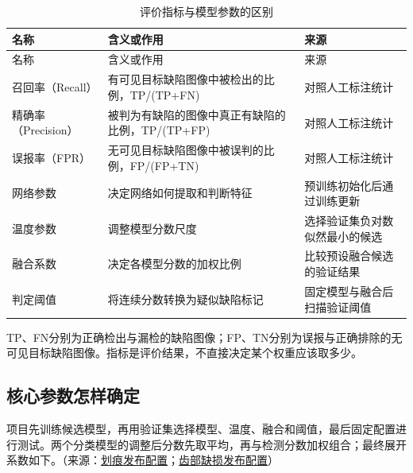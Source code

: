 \begingroup\small{}
\begin{longtable}{@{}>{\raggedright\arraybackslash}p{0.240\dimexpr\linewidth-4\tabcolsep\relax}>{\raggedright\arraybackslash}p{0.340\dimexpr\linewidth-4\tabcolsep\relax}>{\raggedright\arraybackslash}p{0.420\dimexpr\linewidth-4\tabcolsep\relax}@{}}
\caption{评价指标与模型参数的区别}\\
\toprule
名称 & 含义或作用 & 来源 \\
\midrule\endfirsthead
\toprule
名称 & 含义或作用 & 来源 \\
\midrule\endhead
\midrule\multicolumn{3}{r}{\footnotesize 续下页}\endfoot
\bottomrule\endlastfoot
召回率（Recall） & 有可见目标缺陷图像中被检出的比例，TP/(TP+FN) & 对照人工标注统计 \\
精确率（Precision） & 被判为有缺陷的图像中真正有缺陷的比例，TP/(TP+FP) & 对照人工标注统计 \\
误报率（FPR） & 无可见目标缺陷图像中被误判的比例，FP/(FP+TN) & 对照人工标注统计 \\
网络参数 & 决定网络如何提取和判断特征 & 预训练初始化后通过训练更新 \\
温度参数 & 调整模型分数尺度 & 选择验证集负对数似然最小的候选 \\
融合系数 & 决定各模型分数的加权比例 & 比较预设融合候选的验证结果 \\
判定阈值 & 将连续分数转换为疑似缺陷标记 & 固定模型与融合后扫描验证阈值 \\
\end{longtable}\endgroup

TP、FN分别为正确检出与漏检的缺陷图像；FP、TN分别为误报与正确排除的无可见目标缺陷图像。指标是评价结果，不直接决定某个权重应该取多少。

\FloatBarrier{}\subsection{核心参数怎样确定}
项目先训练候选模型，再用验证集选择模型、温度、融合和阈值，最后固定配置进行测试。两个分类模型的调整后分数先取平均，再与检测分数加权组合；最终展开系数如下。（来源：\protect\hyperlink{source-1}{划痕发布配置}；\protect\hyperlink{source-2}{齿部缺损发布配置}）


